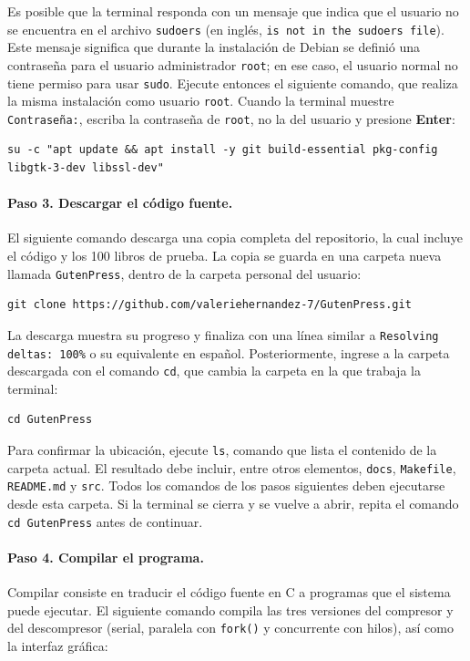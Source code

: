 \documentclass{report}
\begin{document}
Es posible que la terminal responda con un mensaje que indica que el usuario no se encuentra en el archivo \texttt{sudoers} (en inglés, \texttt{is not in the sudoers file}). Este mensaje significa que durante la instalación de Debian se definió una contraseña para el usuario administrador \texttt{root}; en ese caso, el usuario normal no tiene permiso para usar \texttt{sudo}. Ejecute entonces el siguiente comando, que realiza la misma instalación como usuario \texttt{root}. Cuando la terminal muestre \texttt{Contraseña:}, escriba la contraseña de \texttt{root}, no la del usuario y presione \textbf{Enter}:

\begin{lstlisting}[style=terminal]
su -c "apt update && apt install -y git build-essential pkg-config libgtk-3-dev libssl-dev"
\end{lstlisting}

\paragraph{Paso 3. Descargar el código fuente.} El siguiente comando descarga una copia completa del repositorio, la cual incluye el código y los 100 libros de prueba. La copia se guarda en una carpeta nueva llamada \texttt{GutenPress}, dentro de la carpeta personal del usuario:

\begin{lstlisting}[style=terminal]
git clone https://github.com/valeriehernandez-7/GutenPress.git
\end{lstlisting}

La descarga muestra su progreso y finaliza con una línea similar a \texttt{Resolving deltas: 100\%} o su equivalente en español. Posteriormente, ingrese a la carpeta descargada con el comando \texttt{cd}, que cambia la carpeta en la que trabaja la terminal:

\begin{lstlisting}[style=terminal]
cd GutenPress
\end{lstlisting}

Para confirmar la ubicación, ejecute \texttt{ls}, comando que lista el contenido de la carpeta actual. El resultado debe incluir, entre otros elementos, \texttt{docs}, \texttt{Makefile}, \texttt{README.md} y \texttt{src}. Todos los comandos de los pasos siguientes deben ejecutarse desde esta carpeta. Si la terminal se cierra y se vuelve a abrir, repita el comando \texttt{cd GutenPress} antes de continuar.

\paragraph{Paso 4. Compilar el programa.} Compilar consiste en traducir el código fuente en C a programas que el sistema puede ejecutar. El siguiente comando compila las tres versiones del compresor y del descompresor (serial, paralela con \texttt{fork()} y concurrente con hilos), así como la interfaz gráfica:
\end{document}
